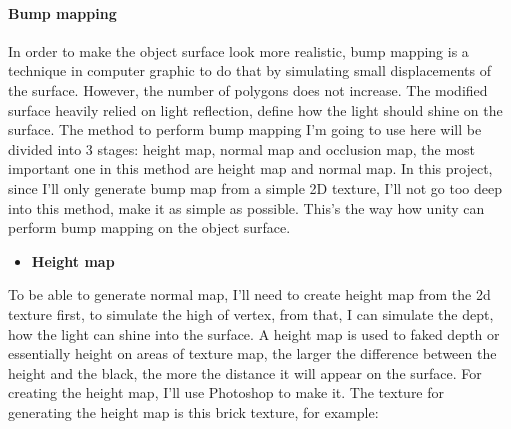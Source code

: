 \documentclass[a4paper, 13pt]{extarticle}
\begin{document}
	\paragraph{Bump mapping}
	In order to make the object surface look more realistic, bump mapping is a technique in computer graphic to do that by simulating small displacements of the surface. However, the number of polygons does not increase. The modified surface heavily relied on light reflection, define how the light should shine on the surface.
	The method to perform bump mapping I'm going to use here will be divided into 3 stages: height map, normal map and occlusion map, the most important one in this method are height map and normal map. In this project, since I'll only generate bump map from a simple 2D texture, I'll not go too deep into this method, make it as simple as possible. This's the way how unity can perform bump mapping on the object surface.
	\begin{itemize}
		\item \bfseries Height map	 	
	\end{itemize}
		To be able to generate normal map, I'll need to create height map from the 2d texture first, to simulate the high of vertex, from that, I can simulate the dept, how the light can shine into the surface. A height map is used to faked depth or essentially height on areas of texture map, the larger the difference between the height and the black, the more the distance it will appear on the surface. For creating the height map, I'll use Photoshop to make it. The texture for generating  the height map is this brick texture, for example: 
\end{document}
